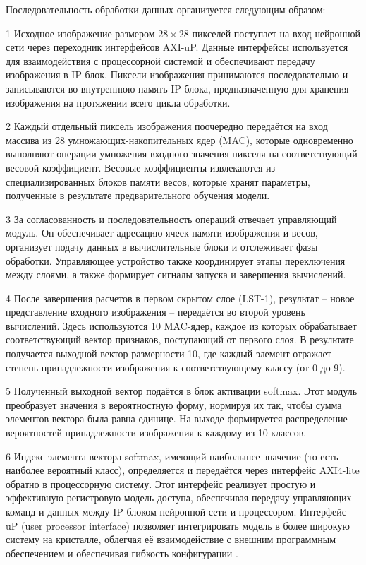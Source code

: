 
Последовательность обработки данных организуется следующим образом:

  1 Исходное изображение размером \(28\times28\) пикселей поступает на вход 
нейронной сети через переходник интерфейсов AXI-uP. Данные интерфейсы 
используется для взаимодействия с процессорной системой и обеспечивают передачу 
изображения в IP-блок. Пиксели изображения принимаются последовательно и 
записываются во внутреннюю память IP-блока, предназначенную для хранения 
изображения на протяжении всего цикла обработки.

  2 Каждый отдельный пиксель изображения поочередно передаётся на вход массива 
из 28 умножающих-накопительных ядер (MAC), которые одновременно выполняют 
операции умножения входного значения пикселя на соответствующий весовой 
коэффициент. Весовые коэффициенты извлекаются из специализированных блоков 
памяти весов, которые хранят параметры, полученные в результате 
предварительного обучения модели.

  3 За согласованность и последовательность операций отвечает управляющий 
модуль. Он обеспечивает адресацию ячеек памяти изображения и весов, организует 
подачу данных в вычислительные блоки и отслеживает фазы обработки. Управляющее 
устройство также координирует этапы переключения между слоями, а также 
формирует сигналы запуска и завершения вычислений.

  4 После завершения расчетов в первом скрытом слое (LST-1), результат – новое 
представление входного изображения – передаётся во второй уровень вычислений. 
Здесь используются 10 MAC-ядер, каждое из которых обрабатывает соответствующий 
вектор признаков, поступающий от первого слоя. В результате получается выходной 
вектор размерности 10, где каждый элемент отражает степень принадлежности 
изображения к соответствующему классу (от 0 до 9).

  5 Полученный выходной вектор подаётся в блок активации softmax. Этот модуль 
преобразует значения в вероятностную форму, нормируя их так, чтобы сумма 
элементов вектора была равна единице. На выходе формируется распределение 
вероятностей принадлежности изображения к каждому из 10 классов.

  6 Индекс элемента вектора softmax, имеющий наибольшее значение (то есть 
наиболее вероятный класс), определяется и передаётся через интерфейс AXI4-lite 
обратно в процессорную систему. Этот интерфейс реализует простую и эффективную 
регистровую модель доступа, обеспечивая передачу управляющих команд и данных 
между IP-блоком нейронной сети и процессором. Интерфейс uP (user processor 
interface) позволяет интегрировать модель в более широкую систему на кристалле, 
облегчая её взаимодействие с внешним программным обеспечением и обеспечивая 
гибкость конфигурации \cite{chu_fpga}.

